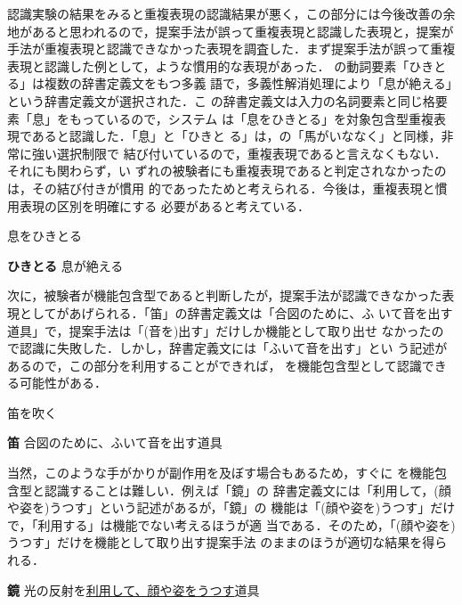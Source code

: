 \documentclass{nlp}
\begin{document}
認識実験の結果をみると重複表現の認識結果が悪く，この部分には今後改善の余
地があると思われるので，提案手法が誤って重複表現と認識した表現と，提案が
手法が重複表現と認識できなかった表現を調査した．まず提案手法が誤って重複
表現と認識した例として，ような慣用的な表現があった．
の動詞要素「ひきとる」は複数の辞書定義文をもつ多義
語で，多義性解消処理により「息が絶える」という辞書定義文が選択された．こ
の辞書定義文は入力の名詞要素と同じ格要素「息」をもっているので，システム
は「息をひきとる」を対象包含型重複表現であると認識した．「息」と「ひきと
る」は，の「馬がいななく」と同様，非常に強い選択制限で
結び付いているので，重複表現であると言えなくもない．それにも関わらず，い
ずれの被験者にも重複表現であると判定されなかったのは，その結び付きが慣用
的であったためと考えられる．今後は，重複表現と慣用表現の区別を明確にする
必要があると考えている．
\begin{example}
 \item 息をひきとる 

 {\bf ひきとる} \hspace{10pt}息が絶える
\end{example}
次に，被験者が機能包含型であると判断したが，提案手法が認識できなかった表
現としてがあげられる．「笛」の辞書定義文は「合図のために、ふ
いて音を出す道具」で，提案手法は「(音を)出す」だけしか機能として取り出せ
なかったので認識に失敗した．しかし，辞書定義文には「ふいて音を出す」とい
う記述があるので，この部分を利用することができれば，
を機能包含型として認識できる可能性がある．
\begin{example}
 \item 笛を吹く 

 {\bf 笛} \hspace{10pt}合図のために、ふいて音を出す道具
\end{example}
当然，このような手がかりが副作用を及ぼす場合もあるため，すぐに
を機能包含型と認識することは難しい．例えば「鏡」の
辞書定義文には「利用して，(顔や姿を)うつす」という記述があるが，「鏡」の
機能は「(顔や姿を)うつす」だけで，「利用する」は機能でない考えるほうが適
当である．そのため，「(顔や姿を)うつす」だけを機能として取り出す提案手法
のままのほうが適切な結果を得られる．
\begin{example}
 \item {\bf 鏡} \hspace{10pt}光の反射を\underline{利用して、顔や姿をうつす}道具
\end{example}
\end{document}

